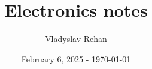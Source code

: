





\title{Electronics notes}
\date{February 6, 2025 - \today}
\author{Vladyslav Rehan}
\maketitle

\tableofcontents





\printbibliography


